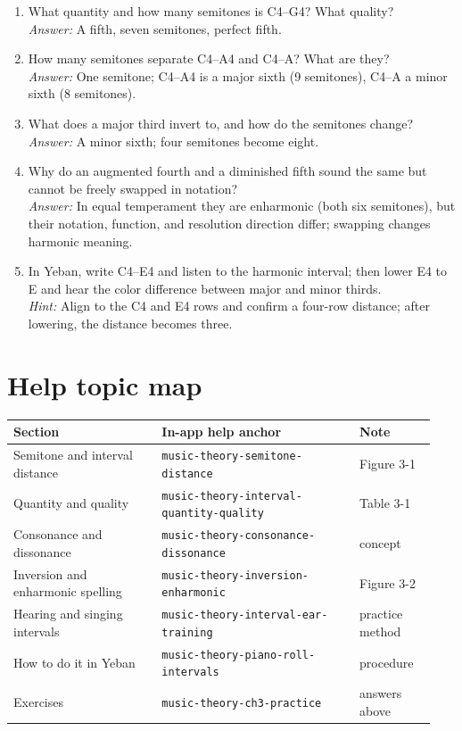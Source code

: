 \begin{exercise}
\begin{enumerate}
  \item What quantity and how many semitones is C4--G4? What quality?\\
  \emph{Answer:} A fifth, seven semitones, perfect fifth.
  \item How many semitones separate C4--A4 and C4--A? What are they?\\
  \emph{Answer:} One semitone; C4--A4 is a major sixth (9 semitones), C4--A a minor sixth (8 semitones).
  \item What does a major third invert to, and how do the semitones change?\\
  \emph{Answer:} A minor sixth; four semitones become eight.
  \item Why do an augmented fourth and a diminished fifth sound the same but cannot be freely swapped in notation?\\
  \emph{Answer:} In equal temperament they are enharmonic (both six semitones), but their notation, function, and resolution direction differ; swapping changes harmonic meaning.
  \item In Yeban, write C4--E4 and listen to the harmonic interval; then lower E4 to E and hear the color difference between major and minor thirds.\\
  \emph{Hint:} Align to the C4 and E4 rows and confirm a four-row distance; after lowering, the distance becomes three.
\end{enumerate}
\end{exercise}

\section{Help topic map}

\begin{center}
\footnotesize
\setlength{\tabcolsep}{3pt}
\begin{longtable}{p{0.33\linewidth}p{0.44\linewidth}p{0.17\linewidth}}
\toprule
Section & In-app help anchor & Note \\
\midrule
\endhead
Semitone and interval distance & \texttt{music-theory-semitone-distance} & Figure 3-1 \\
Quantity and quality & \texttt{music-theory-interval-quantity-quality} & Table 3-1 \\
Consonance and dissonance & \texttt{music-theory-consonance-dissonance} & concept \\
Inversion and enharmonic spelling & \texttt{music-theory-inversion-enharmonic} & Figure 3-2 \\
Hearing and singing intervals & \texttt{music-theory-interval-ear-training} & practice method \\
How to do it in Yeban & \texttt{music-theory-piano-roll-intervals} & procedure \\
Exercises & \texttt{music-theory-ch3-practice} & answers above \\
\bottomrule
\end{longtable}
\end{center}

